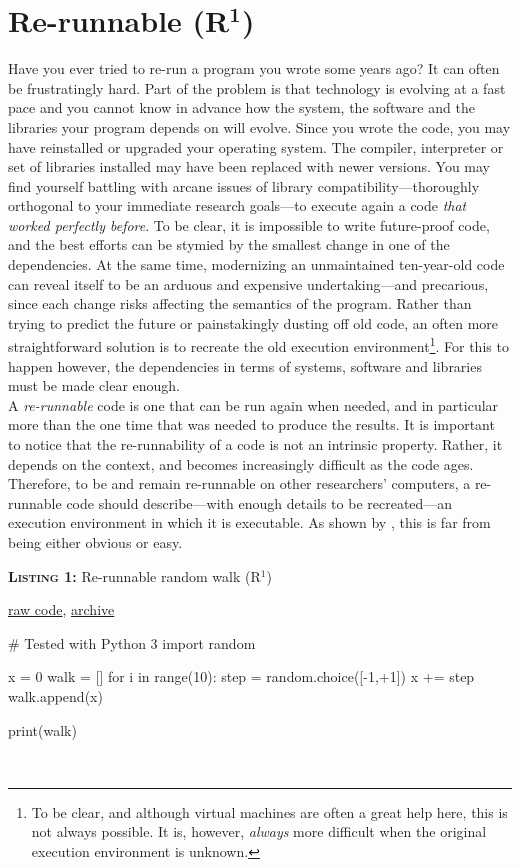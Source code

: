 \documentclass[a4paper,11pt]{article}
\begin{document}
\clearpage
\section*{Re-runnable (R$^{\mathbf 1}$)}

Have you ever tried to re-run a program you wrote some years ago? It can often be frustratingly hard. Part of the problem is that technology is evolving at a fast pace and you cannot know in advance how the system, the software and the libraries your program depends on will evolve. Since you wrote the code, you may have reinstalled or upgraded  your operating system. The compiler, interpreter or set of libraries installed may have been replaced with newer versions. You may find yourself battling with arcane issues of library compatibility---thoroughly orthogonal to your immediate research  goals---to execute again a code \emph{that worked perfectly before}. To be clear, it is impossible to write future-proof code, and the best efforts can be stymied by the smallest change in one of the dependencies. At the same time, modernizing an unmaintained ten-year-old code can reveal itself to be an arduous and expensive undertaking---and precarious, since each change risks affecting the semantics of the program. Rather than trying to predict the future or painstakingly dusting off old code, an often more straightforward solution is to recreate the old execution environment\footnote{To be clear, and although virtual machines are often a great help here, this is not always possible. It is, however, \emph{always} more difficult when the original execution environment is unknown.}. For this to happen however, the dependencies in terms of systems, software and libraries must be made clear enough.\\

A \emph{re-runnable} code is one that can be run again when needed, and in particular more than the one time that was needed to produce the results. It is important to notice that the re-runnability of a code is not an intrinsic property. Rather, it depends on the context, and becomes increasingly difficult as the code ages. Therefore, to be and remain re-runnable on other researchers' computers, a re-runnable code should describe---with enough details to be recreated---an execution environment in which it is executable. As shown by \citep{Collberg:2016}, this is far from being either obvious or easy.\\

\noindent \begin{minipage}[c]{\linewidth}
\begin{code}{\parbox{.8\textwidth}{\textbf{\textsc{Listing 1:}} Re-runnable random walk (R$^1$)}\parbox{.161\textwidth}{\hfill \href{https://raw.githubusercontent.com/rougier/random-walk/frontiers/random-walk-R1.py}{raw code}, \href{https://doi.org/10.5281/zenodo.848217}{archive}}}
# Tested with Python 3
import random

x =  0
walk = []
for i in range(10):
    step = random.choice([-1,+1])
    x += step
    walk.append(x)

print(walk)
\end{code}
\end{minipage}\\
\end{document}
